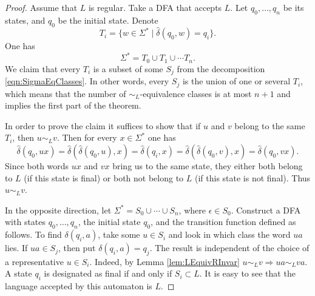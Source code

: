 

\setcounter{section}{4}
\setcounter{subsection}{3}
\setcounter{dfn}{7}

\begin{proof}
Assume that $L$ is regular.
Take a DFA that accepts $L$.
Let $q_0, \ldots, q_n$ be its states, and $q_0$ be the initial state.
Denote
\[
T_i = \{w \in \Sigma^* \mid \widehat{\delta}(q_0, w) = q_i\}.
\]
One has
\[
\Sigma^* = T_0 \cup T_1 \cup \cdots T_n.
\]
We claim that every $T_i$ is a subset of some $S_j$ from the decomposition \eqref{eqn:SigmaEqClasses}.
In other words, every $S_j$ is the union of one or several $T_i$,
which means that the number of $\sim_L$-equivalence classes is at most $n+1$ and implies the first part of the theorem.

In order to prove the claim it suffices to show that if $u$ and $v$ belong to the same $T_i$, then $u \sim_L v$.
Then for every $x \in \Sigma^*$ one has
\[
\widehat{\delta}(q_0, ux) = \widehat{\delta}(\widehat{\delta}(q_0,u), x) = \widehat{\delta}(q_i, x)
= \widehat{\delta}(\widehat{\delta}(q_0,v), x) = \widehat{\delta}(q_0, vx).
\]
Since both words $ux$ and $vx$ bring us to the same state, they either both belong to $L$ (if this state is final)
or both not belong to $L$ (if this state is not final).
Thus $u \sim_L v$.


In the opposite direction, let $\Sigma^* = S_0 \cup \cdots \cup S_n$, where $\epsilon \in S_0$.
Construct a DFA with states $q_0, \ldots, q_n$, the initial state $q_0$, and the transition function defined as follows.
To find $\delta(q_i, a)$, take some $u \in S_i$ and look in which class the word $ua$ lies.
If $ua \in S_j$, then put $\delta(q_i, a) = q_j$.
The result is independent of the choice of a representative $u \in S_i$.
Indeed, by Lemma \ref{lem:LEquivRInvar} $u \sim_L v \Rightarrow ua \sim_L va$.
A state $q_i$ is designated as final if and only if $S_i \subset L$.
It is easy to see that the language accepted by this automaton is $L$.
\end{proof}



